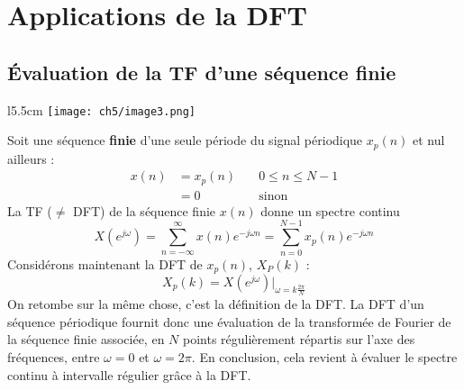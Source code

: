 \section{Applications de la DFT}
	\subsection{Évaluation de la TF d'une séquence finie}
		\begin{wrapfigure}[8]{l}{5.5cm}
	\vspace{-5mm}
	\texttt{[image: ch5/image3.png]}
	\end{wrapfigure}	
	Soit une séquence \textbf{finie} d'une seule période du signal périodique $x_p(n)$ et 
	nul ailleurs :
	\begin{equation}
	\begin{array}{lll}
	x(n) &= x_p(n)&\quad 0\leq n\leq N-1\\
	&=0&\quad\text{sinon}
	\end{array}
	\end{equation}
	La TF ($\neq$ DFT) de la séquence finie $x(n)$ donne un spectre continu
	\begin{equation}
	X(e^{j\omega}) = \sum_{n=-\infty}^\infty x(n)e^{-j\omega n} = \sum_{n=0}^{N-1} x_p(n)
	e^{-j\omega n}
	\end{equation}
	Considérons maintenant la DFT de $x_p(n)$, $X_P(k)$ :
	\begin{equation}
	X_p(k) = X(e^{j\omega})|_{\omega=k\frac{2\pi}{N}}
	\end{equation}
	On retombe sur la même chose, c'est la définition de la DFT. La DFT d'un séquence périodique 
	fournit donc une évaluation de la transformée de Fourier de la séquence finie associée, en $N$ 
	points régulièrement répartis sur l'axe des fréquences, entre $\omega=0$ et $\omega=2\pi$. En 
	conclusion, cela revient à évaluer le spectre continu à intervalle régulier grâce à la DFT.\\
	
